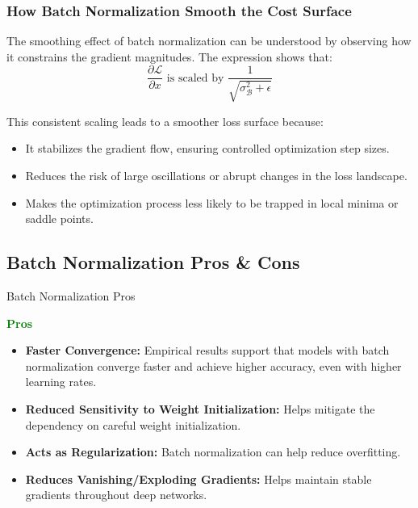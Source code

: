\documentclass[serif, aspectratio=169]{beamer}
\begin{document}
\begin{frame}
    \frametitle{How Batch Normalization Smooth the Cost Surface}

    The smoothing effect of batch normalization can be understood by observing how it constrains the gradient magnitudes. The expression shows that:
    \begin{equation}
        \frac{\partial \mathcal{L}}{\partial x} \text{ is scaled by } \frac{1}{\sqrt{\sigma_{\mathcal{B}}^2 + \epsilon}}
    \end{equation}

    This consistent scaling leads to a smoother loss surface because:
    \begin{itemize}
        \item It stabilizes the gradient flow, ensuring controlled optimization step sizes.
        \item Reduces the risk of large oscillations or abrupt changes in the loss landscape.
        \item Makes the optimization process less likely to be trapped in local minima or saddle points.
    \end{itemize}
\end{frame}


\subsection{Batch Normalization Pros \& Cons}

\begin{frame}{Batch Normalization Pros}

    \textcolor{green}{\textbf{Pros}}
    
    \begin{itemize}

        \item \textbf{Faster Convergence:}  Empirical results support that models with batch normalization converge faster and achieve higher accuracy, even with higher learning rates.
        \item \textbf{Reduced Sensitivity to  Weight Initialization:} Helps mitigate the dependency on careful weight initialization.
        \item \textbf{Acts as Regularization:} Batch normalization can help reduce overfitting.
        \item \textbf{Reduces Vanishing/Exploding Gradients:} Helps maintain stable gradients throughout deep networks.


    \end{itemize}
\end{frame}
\end{document}

